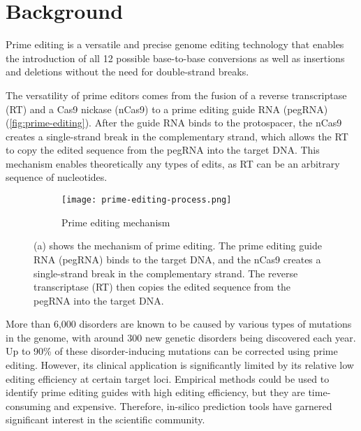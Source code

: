 \section{Background}

Prime editing is a versatile and precise genome editing technology that enables the introduction of all 12 possible base-to-base conversions as well as insertions and deletions without the need for double-strand breaks\cite{liudavidr.SearchreplaceGenomeEditing2019}. 

The versatility of prime editors comes from the fusion of a reverse transcriptase (RT) and a Cas9 nickase (nCas9) to a prime editing guide RNA (pegRNA) (\autoref{fig:prime-editing}). After the guide RNA binds to the protospacer, the nCas9 creates a single-strand break in the complementary strand, which allows the RT to copy the edited sequence from the pegRNA into the target DNA. This mechanism enables theoretically any types of edits, as RT can be an arbitrary sequence of nucleotides\cite{liudavidr.SearchreplaceGenomeEditing2019}.  

\begin{figure}[ht]
    \centering
    \begin{subfigure}{0.5\textwidth}
        \texttt{[image: prime-editing-process.png]}
        \caption{Prime editing mechanism}
        \label{fig:prime-editing}  
    \end{subfigure}
    \caption{(a) shows the mechanism of prime editing. The prime editing guide RNA (pegRNA) binds to the target DNA, and the nCas9 creates a single-strand break in the complementary strand. The reverse transcriptase (RT) then copies the edited sequence from the pegRNA into the target DNA.}
    \label{fig:figure-1}
\end{figure}

More than 6,000 disorders are known to be caused by various types of mutations in the genome, with around 300 new genetic disorders being discovered each year\cite{petraityteGenomeEditingMedicine2021}. Up to 90\% of these disorder-inducing mutations can be corrected using prime editing\cite{kantorCRISPRCas9DNABaseEditing2020}. However, its clinical application is significantly limited by its relative low editing efficiency at certain target loci.  Empirical methods could be used to identify prime editing guides with high editing efficiency, but they are time-consuming and expensive. Therefore, in-silico prediction tools have garnered significant interest in the scientific community.

